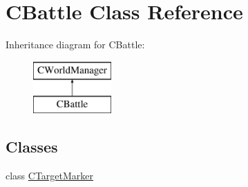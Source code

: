 \hypertarget{class_c_battle}{}\section{C\+Battle Class Reference}
\label{class_c_battle}
Inheritance diagram for C\+Battle\+:\begin{figure}[H]
\begin{center}
\leavevmode
\includegraphics[height=2.000000cm]{class_c_battle}
\end{center}
\end{figure}
\subsection*{Classes}
\begin{DoxyCompactItemize}
\item 
class \hyperlink{class_c_battle_1_1_c_target_marker}{C\+Target\+Marker}
\end{DoxyCompactItemize}
